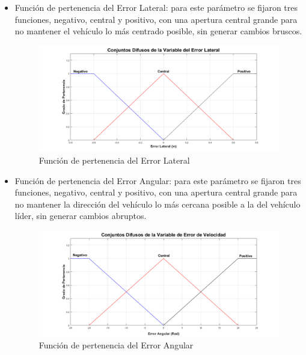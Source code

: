 \begin{itemize} 

\item Función de pertenencia del Error Lateral: para este parámetro se fijaron tres funciones, negativo, central y positivo, con una apertura central grande para no mantener el vehículo lo más centrado posible, sin generar cambios bruscos.

\begin{figure}[!h]
	\centering
		\includegraphics[scale=0.29]{Imagenes/fuzzylat}
		\caption{Función de pertenencia del Error Lateral}
		\label{fig:fuzzylat}
\end{figure}	 



\item Función de pertenencia del Error Angular: para este parámetro se fijaron tres funciones, negativo, central y positivo, con una apertura central grande para no mantener la dirección del vehículo lo más cercana posible a la del vehículo líder, sin generar cambios abruptos.

\begin{figure}[!h]
	\centering
		\includegraphics[scale=0.29]{Imagenes/fuzzyang}
		\caption{Función de pertenencia del Error Angular}
		\label{fig:fuzzyang}
\end{figure}	 
\end{itemize}

